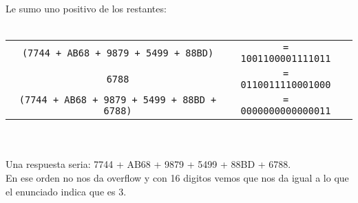 \documentclass[12pt]{article}
\begin{document}
Le sumo uno positivo de los restantes: \\ \\
\begin{tabular}{c c c}
\texttt{(7744 + AB68 + 9879 + 5499 + 88BD)}        & \texttt{= 1001100001111011} \\
\texttt{6788}                                      & \texttt{= 0110011110001000} \\
\texttt{(7744 + AB68 + 9879 + 5499 + 88BD + 6788)} & \texttt{= 0000000000000011}
\end{tabular} \\ \\



Una respuesta seria: 7744 + AB68 + 9879 + 5499 + 88BD + 6788. \\
En ese orden no nos da overflow y con 16 digitos vemos que nos da igual a lo que el enunciado indica que es 3.
\end{document}
